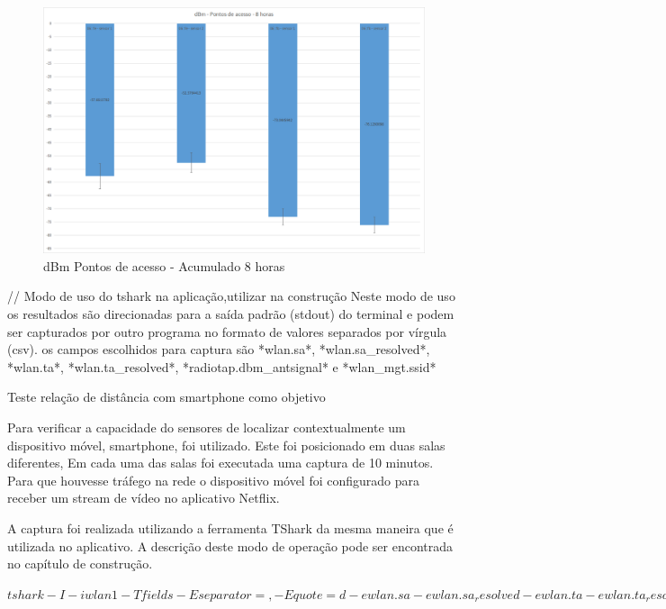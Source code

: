 \begin{figure}[htb]
	\caption{\label{fig:modulos-esp}dBm Pontos de acesso - Acumulado 8 horas}
	\begin{center}
		\includegraphics[width=1\textwidth]{060-testes/data-analisis/night-run/dBm-Pontos_de_acesso-8horas.png}
	\end{center}
\end{figure}


// Modo de uso do tshark na aplicação,utilizar na construção
Neste modo de uso os resultados são direcionadas para a saída padrão
(stdout)  do terminal e podem ser capturados por outro programa no formato
de valores separados por vírgula (csv).  os campos escolhidos para captura
são *wlan.sa*, *wlan.sa_resolved*, *wlan.ta*, *wlan.ta_resolved*, *radiotap.dbm_antsignal* e *wlan_mgt.ssid*

Teste relação de distância com smartphone como objetivo

Para verificar a capacidade do sensores de localizar contextualmente um dispositivo
móvel, smartphone, foi utilizado. Este foi posicionado em duas salas diferentes, Em
cada uma das salas foi executada uma captura de 10 minutos. Para que houvesse tráfego
na rede o dispositivo móvel foi configurado para receber um stream de vídeo no aplicativo Netflix.

A captura foi realizada utilizando a ferramenta TShark da mesma maneira que é utilizada no
aplicativo. A descrição deste modo de operação pode ser encontrada no capítulo de construção.

$
tshark -I -i wlan1 -T fields -E separator=, -E quote=d -e wlan.sa -e wlan.sa_resolved -e wlan.ta -e wlan.ta_resolved -e radiotap.dbm_antsignal -e wlan_mgt.ssid >> sensor-02-distance-test-01.csv
$

